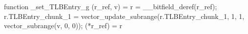 function _set_TLBEntry_g (r_ref, v) = {
    r = __bitfield_deref(r_ref);
    r.TLBEntry_chunk_1 = vector_update_subrange(r.TLBEntry_chunk_1, 1, 1, vector_subrange(v, 0, 0));
    (*r_ref) = r
}
